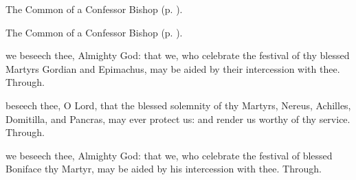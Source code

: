 


\begin{rubric}
	The Common of a Confessor Bishop (p. \pageref{ConfessorBishopCollect}).
\end{rubric}



\begin{rubric}
	The Common of a Confessor Bishop (p. \pageref{CommonConfessorBishop}).
\end{rubric}




\memorialCollect
{} we beseech thee, Almighty God: that we, who celebrate the festival of thy blessed Martyrs Gordian and Epimachus, may be aided by their intercession with thee. Through.



\memorialCollect
{} beseech thee, O Lord, that the blessed solemnity of thy Martyrs, Nereus, Achilles, Domitilla, and Pancras, may ever protect us: and render us worthy of thy service. Through.


\clearpage
{}


\memorialCollect
{} we beseech thee, Almighty God: that we, who celebrate the festival of blessed Boniface thy Martyr, may be aided by his intercession with thee. Through.



